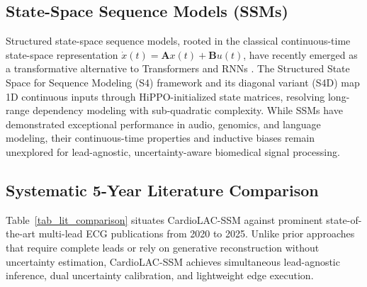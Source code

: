 \documentclass[journal,11pt,draftclsnofoot,onecolumn]{IEEEtran}
\begin{document}
\subsection{State-Space Sequence Models (SSMs)}
Structured state-space sequence models, rooted in the classical continuous-time state-space representation $\dot{x}(t) = \mathbf{A} x(t) + \mathbf{B} u(t)$, have recently emerged as a transformative alternative to Transformers and RNNs \cite{ref_29}. The Structured State Space for Sequence Modeling (S4) framework \cite{ref_30} and its diagonal variant (S4D) \cite{ref_31} map 1D continuous inputs through HiPPO-initialized state matrices, resolving long-range dependency modeling with sub-quadratic complexity. While SSMs have demonstrated exceptional performance in audio, genomics, and language modeling, their continuous-time properties and inductive biases remain unexplored for lead-agnostic, uncertainty-aware biomedical signal processing.

\subsection{Systematic 5-Year Literature Comparison}
Table~\ref{tab_lit_comparison} situates CardioLAC-SSM against prominent state-of-the-art multi-lead ECG publications from 2020 to 2025. Unlike prior approaches that require complete leads or rely on generative reconstruction without uncertainty estimation, CardioLAC-SSM achieves simultaneous lead-agnostic inference, dual uncertainty calibration, and lightweight edge execution.
\end{document}
